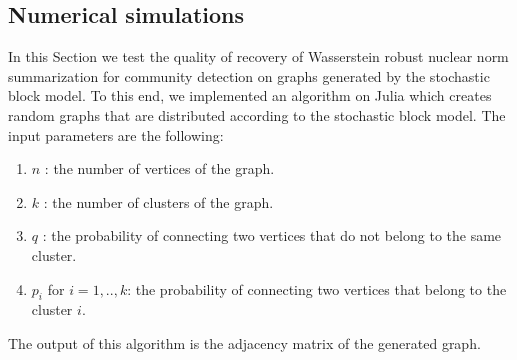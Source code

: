 \documentclass[12pt]{amsart}
\theoremstyle{remark}
\begin{document}
\subsection{Numerical simulations}
\label{Numerics}
In this Section we test the quality of recovery of Wasserstein robust nuclear norm summarization for community detection on graphs generated by the stochastic block model. To this end, we implemented an algorithm on Julia which creates random graphs that are distributed according to the stochastic block model. The input parameters are the following:
\begin{enumerate}
\item $n$ : the number of vertices of the graph.
\item $k$ : the number of clusters of the graph.
\item $q$ : the probability of connecting two vertices that do not belong to the same cluster.
\item $p_i$ for $i=1,..,k$: the probability of connecting two vertices that belong to the cluster $i$.
\end{enumerate}
The output of this algorithm is the adjacency matrix of the generated graph. 
\end{document}
